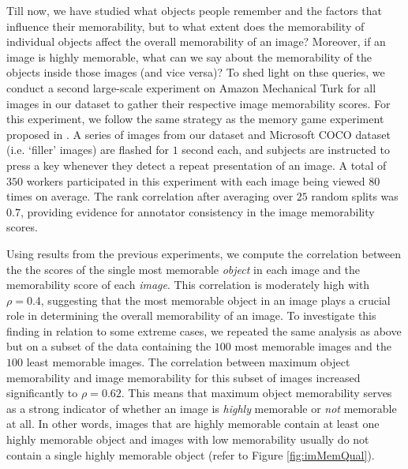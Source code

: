 Till now, we have studied what objects people remember and the factors that influence their memorability, but to what extent does the memorability of individual objects affect the overall memorability of an image? Moreover, if an image is highly memorable, what can we say about the memorability of the objects inside those images (and vice versa)? To shed light on thse queries, we conduct a second large-scale experiment on Amazon Mechanical Turk for all images in our dataset to gather their respective image memorability scores. For this experiment, we follow the same strategy as the memory game experiment proposed in \cite{isola11}. A series of images from our dataset and Microsoft COCO dataset \cite{coco14} (i.e. `filler' images) are flashed for $1$ second each, and subjects are instructed to press a key whenever they detect a repeat presentation of an image. A total of $350$ workers participated in this experiment with each image being viewed $80$ times on average. The rank correlation after averaging over $25$ random splits was $0.7$, providing evidence for annotator consistency in the image memorability scores.



\begin{figure*}[!htb]
\centering
{}
\vspace{-5mm}\caption{\footnotesize\textbf{Qual image-object results.} add-in later. }\label{fig:imMemQual}
\end{figure*}


Using results from the previous experiments, we compute the correlation between the the scores of the single most memorable \emph{object} in each image and the memorability score of each \emph{image}. This correlation is moderately high with $\rho=0.4$, suggesting that the most memorable object in an  image plays a crucial role in determining the overall memorability of an image. To investigate this finding in relation to some extreme cases, we repeated the same analysis as above but on a subset of the data containing the $100$ most memorable images and the $100$ least memorable images. The correlation between maximum object memorability and image memorability for this subset of images increased significantly to $\rho=0.62$. This means that maximum object memorability serves as a strong indicator of whether an image is \textit{highly} memorable or \emph{not} memorable at all. In other words, images that are highly memorable contain at least one highly memorable object and images with low memorability usually do not contain a single highly memorable object (refer to Figure \ref{fig:imMemQual}).

